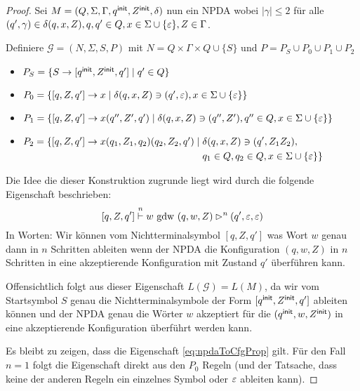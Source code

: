 \begin{proof}
 Sei $M = (Q, \Sigma, \Gamma, q^\mathsf{init}, Z^\mathsf{init}, \delta)$ nun ein \ac{NPDA} wobei $|\gamma| \le 2$ für alle $(q', \gamma) \in \delta(q, x, Z), q, q' \in Q, x \in \Sigma \cup \{\varepsilon\}, Z \in \Gamma$.

    Definiere $\mathcal{G} = (N, \Sigma, S, P)$ mit $N = Q \times \Gamma \times Q \cup \{S\}$  und $P=P_S\cup P_0\cup P_1\cup P_2$
    \begin{itemize}
    \item $P_S = \{S \to [q^\mathsf{init}, Z^\mathsf{init}, q']\mid q'\in Q\}$
    \item $P_0 = \{ [q, Z, q'] \to x \mid \delta(q, x, Z) \ni (q', \varepsilon), x \in \Sigma \cup \{\varepsilon\} \}$
    \item $P_1 = \{[q, Z, q'] \to x(q'', Z', q') \mid \delta(q, x, Z) \ni (q'', Z'), q'' \in Q, x \in \Sigma \cup \{\varepsilon\}\}$
    \item $P_2 = \{[q, Z, q'] \to x(q_1,Z_1,q_2)(q_2, Z_2, q') \mid 
        \begin{aligned}[t]
          & \delta(q, x, Z) \ni (q', Z_1Z_2), \\
          & q_1 \in Q, q_2 \in Q, x \in \Sigma \cup \{\varepsilon\} \}
        \end{aligned}$
    \end{itemize}
    
    Die Idee die dieser Konstruktion zugrunde liegt wird durch die folgende Eigenschaft beschrieben:
      \begin{displaymath}\label{eq:npdaToCfgProp}
        [q,Z,q']\stackrel{n}{\vdash} w \text{ gdw } (q,w,Z) \rhd^n (q',\varepsilon,\varepsilon)
      \end{displaymath}
    In Worten: Wir können vom Nichtterminalsymbol $[q,Z,q']$ was Wort $w$ genau dann in $n$ Schritten ableiten
    wenn der \ac{NPDA} die Konfiguration $(q,w,Z)$ in $n$ Schritten in eine akzeptierende Konfiguration mit Zustand $q'$ überführen kann.
    
    Offensichtlich folgt aus dieser Eigenschaft $L(\mathcal{G}) = L(M)$, da wir vom Startsymbol $S$ genau die Nichtterminalsymbole der Form
    $[q^\mathsf{init}, Z^\mathsf{init}, q']$ ableiten können und der \ac{NPDA} genau die Wörter $w$ akzeptiert für die  $(q^\mathsf{init}, w, Z^\mathsf{init})$ in eine akzeptierende Konfiguration überführt werden kann.
    
    Es bleibt zu zeigen, dass die Eigenschaft \eqref{eq:npdaToCfgProp} gilt.
    Für den Fall $n=1$ folgt die Eigenschaft direkt aus den $P_0$ Regeln (und der Tatsache, dass keine der anderen Regeln ein einzelnes Symbol oder $\varepsilon$ ableiten kann).
    

\end{proof}
